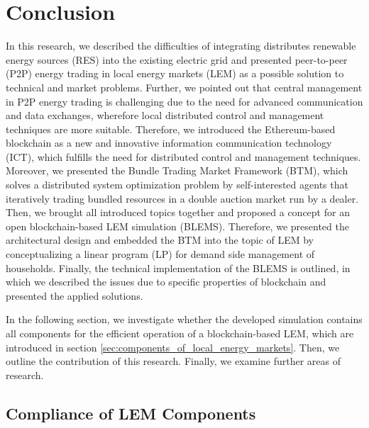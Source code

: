 \section{Conclusion}
In this research, we described the difficulties of integrating distributes renewable energy sources (RES) into 
the existing electric grid and presented peer-to-peer (P2P) energy trading in local energy markets (LEM)
as a possible solution to technical and market problems. Further, we pointed out that central
management in P2P energy trading is challenging due to the need for advanced communication and data exchanges,
wherefore local distributed control and management techniques are more suitable.
Therefore, we introduced the Ethereum-based blockchain as a new and innovative information communication technology (ICT), 
which fulfills the need for distributed control and management techniques.
Moreover, we presented the Bundle Trading Market Framework (BTM), which solves a distributed system
optimization problem by self-interested agents that iteratively trading bundled resources in a double
auction market run by a dealer. 
Then, we brought all introduced topics together and proposed a concept for an open blockchain-based 
LEM simulation (BLEMS). Therefore, we presented the architectural design and embedded the BTM into the topic of LEM
by conceptualizing a linear program (LP) for demand side management of households. 
Finally, the technical implementation of the BLEMS is outlined, in which we described the issues due to
specific properties of blockchain and presented the applied solutions.

In the following section, we investigate whether the developed simulation contains all components for the efficient 
operation of a blockchain-based LEM, which are introduced in section \ref{sec:components_of_local_energy_markets}. 
Then, we outline the contribution of this research. Finally, we examine further areas of research.

\subsection{Compliance of LEM Components}
\label{sec:compliance_of_components}

